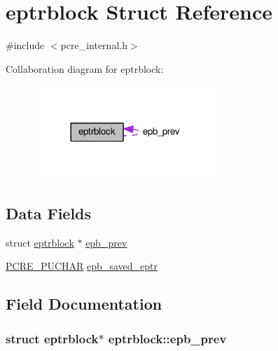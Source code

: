 \hypertarget{structeptrblock}{}\section{eptrblock Struct Reference}
\label{structeptrblock}


{\ttfamily \#include $<$pcre\+\_\+internal.\+h$>$}



Collaboration diagram for eptrblock\+:
\nopagebreak
\begin{figure}[H]
\begin{center}
\leavevmode
\includegraphics[width=197pt]{structeptrblock__coll__graph}
\end{center}
\end{figure}
\subsection*{Data Fields}
\begin{DoxyCompactItemize}
\item 
struct \hyperlink{structeptrblock}{eptrblock} $\ast$ \hyperlink{structeptrblock_a613aa806b17884d92adf0e9c8aaf8473}{epb\+\_\+prev}
\item 
\hyperlink{pcre__internal_8h_a142c7c692c1f94083b0ad52e0520e900}{P\+C\+R\+E\+\_\+\+P\+U\+C\+H\+AR} \hyperlink{structeptrblock_a8d7fa8b39b2731ce4def4c1150e1eb54}{epb\+\_\+saved\+\_\+eptr}
\end{DoxyCompactItemize}


\subsection{Field Documentation}
\subsubsection[{\texorpdfstring{epb\+\_\+prev}{epb_prev}}]{\setlength{\rightskip}{0pt plus 5cm}struct {\bf eptrblock}$\ast$ eptrblock\+::epb\+\_\+prev}\hypertarget{structeptrblock_a613aa806b17884d92adf0e9c8aaf8473}{}\label{structeptrblock_a613aa806b17884d92adf0e9c8aaf8473}
